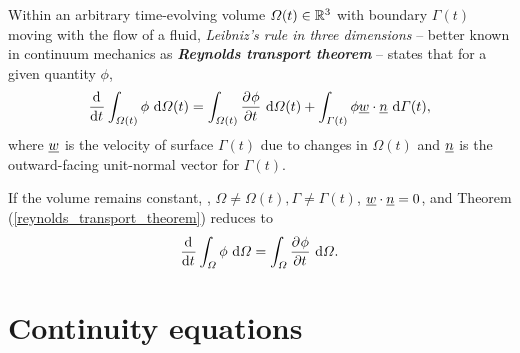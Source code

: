 \begin{theorem}
\label{reynolds_transport_theorem}
Within an arbitrary time-evolving volume $\varOmega(t) \in \mathbb{R}^3$ with boundary $\Gamma(t)$ moving with the flow of a fluid, \emph{Leibniz's rule in three dimensions} -- better known in continuum mechanics as  \textbf{\emph{Reynolds transport theorem}} \citep{reynolds_1903} -- states that for a given quantity $\phi$,
\begin{align*}
  \frac{\mathrm{d}{^{}} }{\mathrm{d} t{^{}} } \int_{\varOmega(t)} \phi \ \mathrm{d}\varOmega(t) = \int_{\varOmega(t)} \frac{\partial{^{}} \phi}{\partial t{^{}} } \ \mathrm{d}\varOmega(t) + \int_{\varGamma(t)} \phi \underline{w} \cdot \underline{n} \ \mathrm{d}\varGamma(t),
\end{align*}
where $\underline{w}$ is the velocity of surface $\Gamma(t)$ due to changes in $\Omega(t)$ and $\underline{n}$ is the outward-facing unit-normal vector for $\Gamma(t)$.
\end{theorem}

\begin{corollary}
\label{constant_volume_reynolds}
If the volume remains constant, \ie, $\Omega \neq \Omega(t), \Gamma \neq \Gamma(t)$, $\underline{w} \cdot \underline{n} = 0$, and Theorem (\ref{reynolds_transport_theorem}) reduces to
\begin{align*}
  \frac{\mathrm{d}{^{}} }{\mathrm{d} t{^{}} } \int_{\varOmega} \phi \ \mathrm{d}\varOmega = \int_{\varOmega} \frac{\partial{^{}} \phi}{\partial t{^{}} } \ \mathrm{d}\varOmega.
\end{align*}
\end{corollary}

\section{Continuity equations} \label{ssn_continuity_equations}

